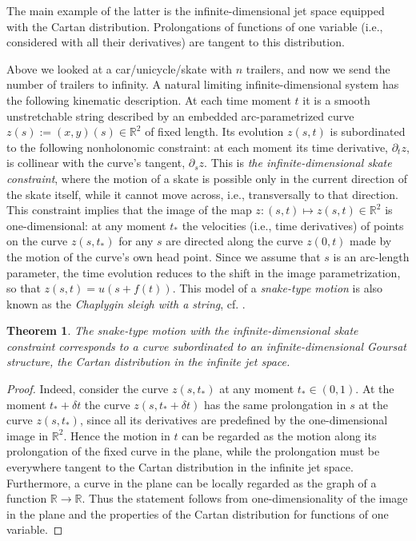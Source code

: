 \documentclass[11pt]{article}
\newtheorem{theorem}[lemma]{Theorem}
\theoremstyle{definition}
\newcounter{ai}
\begin{document}
The main example of the latter is the infinite-dimensional jet space equipped with the Cartan distribution.
Prolongations of functions of one variable (i.e., considered with all their derivatives) are tangent to this distribution. 
\medskip

Above we looked at a car/unicycle/skate with $n$ trailers, and now we send the number of trailers  to infinity. 
A natural limiting infinite-dimensional system has the following kinematic description. At each time moment $t$ it is a smooth unstretchable string described by an embedded arc-parametrized curve $z(s):=(x,y)(s)\in \mathbb R^2$ 
of fixed length. Its evolution $z(s,t) $ is subordinated to the following nonholonomic constraint:
at each moment its time derivative, $\partial_t z$, is collinear with the curve's tangent, $\partial_s z$.
This is {\it the infinite-dimensional skate constraint}, where the motion of a skate is possible only in the current direction of the skate itself, while it cannot move across, i.e., transversally to that direction.
 This constraint implies that the image of the map $z: (s,t)\mapsto z (s,t)\in \mathbb R^2$ is one-dimensional: at any moment $t_*$ the velocities (i.e., time derivatives) of points on the curve
 $z(s, t_*)$ for any $s$ are directed along the curve $z(0, t)$ made by the motion of the curve's own head point. Since we assume that $s$ is an arc-length parameter, the time evolution reduces to the
 shift in the image parametrization, so that $z(s,t)=u(s+f(t))$. This model of  a {\it snake-type motion} is also known as the  {\it Chaplygin sleigh with a string}, cf. \cite{Zenkov}.
  
\begin{theorem}
The snake-type motion with the  infinite-dimensional skate constraint
corresponds to a curve subordinated to an  infinite-dimensional  Goursat structure, the Cartan distribution in the infinite jet space.
\end{theorem}

\begin{proof}
 Indeed, consider the curve $z(s, t_*)$ at any moment $t_*\in (0,1)$. At the moment $t_*+\delta t$ the curve
$z(s, t_*+\delta t)$ has the same prolongation in $s$ at the curve $z(s, t_*)$, since all its derivatives are predefined
by the one-dimensional image in $\mathbb R^2$. Hence the motion in $t$ can be regarded as the motion
along its prolongation of the fixed curve in the plane, while the prolongation must be everywhere tangent to the Cartan distribution in the infinite jet space. Furthermore, a curve in the plane can be locally regarded as
the graph of a function $\mathbb R\to \mathbb R$. 
Thus the statement  follows from one-dimensionality of the image in the plane and the properties of the Cartan distribution for functions of one variable.   
\end{proof}
\end{document}
